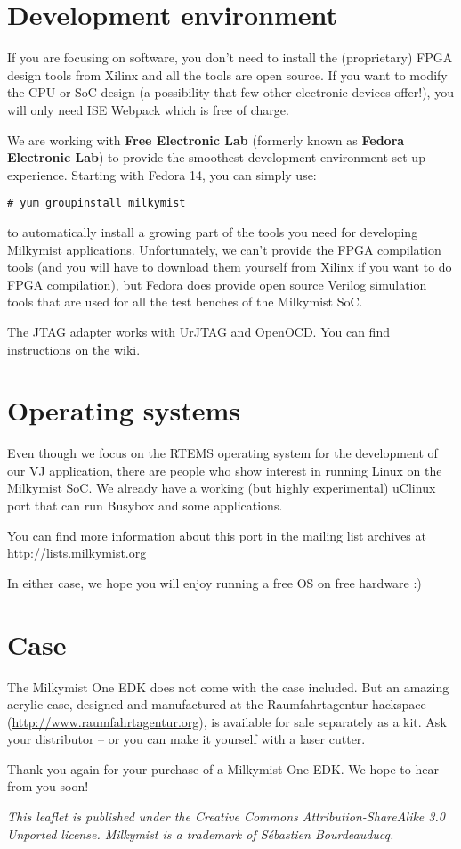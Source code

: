 \documentclass{leaflet}
\begin{document}
\section{Development environment}
If you are focusing on software, you don't need to install the (proprietary) FPGA design tools from Xilinx and all the tools are open source. If you want to modify the CPU or SoC design (a possibility that few other electronic devices offer!), you will only need ISE Webpack which is free of charge.

We are working with \textbf{Free Electronic Lab} (formerly known as \textbf{Fedora Electronic Lab}) to provide the smoothest development environment set-up experience. Starting with Fedora 14, you can simply use:

\begin{verbatim}
# yum groupinstall milkymist
\end{verbatim}

to automatically install a growing part of the tools you need for developing Milkymist applications. Unfortunately, we can't provide the FPGA compilation tools (and you will have to download them yourself from Xilinx if you want to do FPGA compilation), but Fedora does provide open source Verilog simulation tools that are used for all the test benches of the Milkymist SoC.

The JTAG adapter works with UrJTAG and OpenOCD. You can find instructions on the wiki.

\section{Operating systems}
Even though we focus on the RTEMS operating system for the development of our VJ application, there are people who show interest in running Linux on the Milkymist SoC. We already have a working (but highly experimental) uClinux port that can run Busybox and some applications.

You can find more information about this port in the mailing list archives at \url{http://lists.milkymist.org}

In either case, we hope you will enjoy running a free OS on free hardware :)

\section{Case}
The Milkymist One EDK does not come with the case included. But an amazing acrylic case, designed and manufactured at the Raumfahrtagentur hackspace (\url{http://www.raumfahrtagentur.org}), is available for sale separately as a kit. Ask your distributor -- or you can make it yourself with a laser cutter.

Thank you again for your purchase of a Milkymist One EDK. We hope to hear from you soon!

\textit{This leaflet is published under the Creative Commons Attribution-ShareAlike 3.0 Unported license. Milkymist is a trademark of S\'ebastien Bourdeauducq.}
\end{document}
